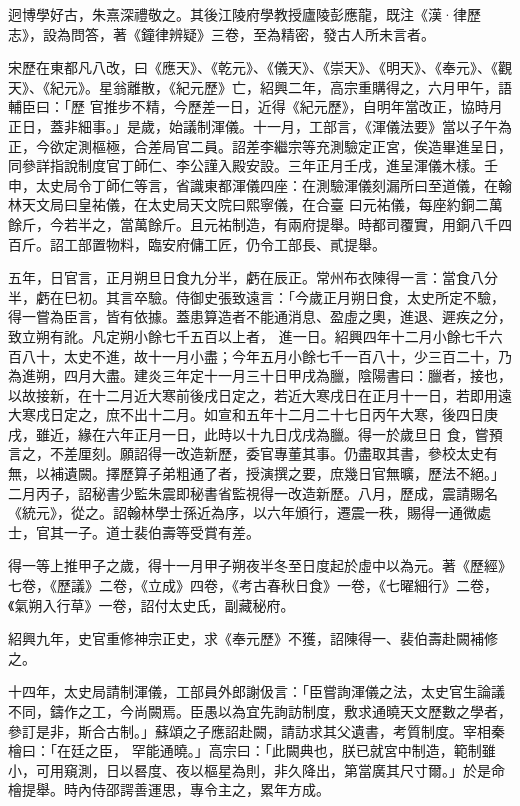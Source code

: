 \begin{pinyinscope}
 迥博學好古，朱熹深禮敬之。其後江陵府學教授廬陵彭應龍，既注《漢·律歷志》，設為問答，著《鐘律辨疑》三卷，至為精密，發古人所未言者。



 宋歷在東都凡八改，曰《應天》、《乾元》、《儀天》、《崇天》、《明天》、《奉元》、《觀天》、《紀元》。星翁離散，《紀元歷》亡，紹興二年，高宗重購得之，六月甲午，語輔臣曰：「歷
 官推步不精，今歷差一日，近得《紀元歷》，自明年當改正，協時月正日，蓋非細事。」是歲，始議制渾儀。十一月，工部言，《渾儀法要》當以子午為正，今欲定測樞極，合差局官二員。詔差李繼宗等充測驗定正宮，俟造畢進呈日，同參詳指說制度官丁師仁、李公謹入殿安設。三年正月壬戌，進呈渾儀木樣。壬申，太史局令丁師仁等言，省識東都渾儀四座：在測驗渾儀刻漏所曰至道儀，在翰林天文局曰皇祐儀，在太史局天文院曰熙寧儀，在合臺
 曰元祐儀，每座約銅二萬餘斤，今若半之，當萬餘斤。且元祐制造，有兩府提舉。時都司覆實，用銅八千四百斤。詔工部置物料，臨安府傭工匠，仍令工部長、貳提舉。



 五年，日官言，正月朔旦日食九分半，虧在辰正。常州布衣陳得一言：當食八分半，虧在巳初。其言卒驗。侍御史張致遠言：「今歲正月朔日食，太史所定不驗，得一嘗為臣言，皆有依據。蓋患算造者不能通消息、盈虛之奧，進退、遲疾之分，致立朔有訛。凡定朔小餘七千五百以上者，
 進一日。紹興四年十二月小餘七千六百八十，太史不進，故十一月小盡；今年五月小餘七千一百八十，少三百二十，乃為進朔，四月大盡。建炎三年定十一月三十日甲戌為臘，陰陽書曰：臘者，接也，以故接新，在十二月近大寒前後戌日定之，若近大寒戌日在正月十一日，若即用遠大寒戌日定之，庶不出十二月。如宣和五年十二月二十七日丙午大寒，後四日庚戌，雖近，緣在六年正月一日，此時以十九日戊戌為臘。得一於歲旦日
 食，嘗預言之，不差厘刻。願詔得一改造新歷，委官專董其事。仍盡取其書，參校太史有無，以補遺闕。擇歷算子弟粗通了者，授演撰之要，庶幾日官無曠，歷法不絕。」二月丙子，詔秘書少監朱震即秘書省監視得一改造新歷。八月，歷成，震請賜名《統元》，從之。詔翰林學士孫近為序，以六年頒行，遷震一秩，賜得一通微處士，官其一子。道士裴伯壽等受賞有差。



 得一等上推甲子之歲，得十一月甲子朔夜半冬至日度起於虛中以為元。著《歷經》
 七卷，《歷議》二卷，《立成》四卷，《考古春秋日食》一卷，《七曜細行》二卷，《氣朔入行草》一卷，詔付太史氏，副藏秘府。



 紹興九年，史官重修神宗正史，求《奉元歷》不獲，詔陳得一、裴伯壽赴闕補修之。



 十四年，太史局請制渾儀，工部員外郎謝伋言：「臣嘗詢渾儀之法，太史官生論議不同，鑄作之工，今尚闕焉。臣愚以為宜先詢訪制度，敷求通曉天文歷數之學者，參訂是非，斯合古制。」蘇頌之子應詔赴闕，請訪求其父遺書，考質制度。宰相秦檜曰：「在廷之臣，
 罕能通曉。」高宗曰：「此闕典也，朕已就宮中制造，範制雖小，可用窺測，日以晷度、夜以樞星為則，非久降出，第當廣其尺寸爾。」於是命檜提舉。時內侍邵諤善運思，專令主之，累年方成。




\end{pinyinscope}
